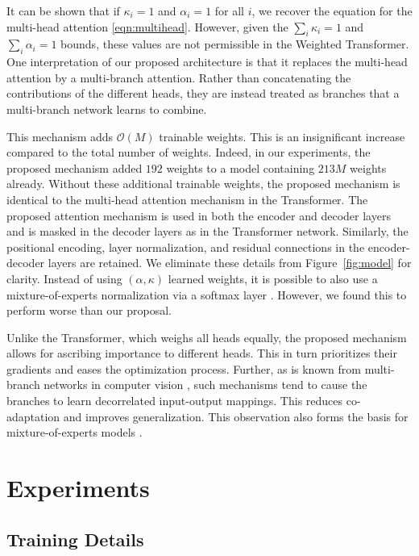 \documentclass{article} %
\newcommand{\name}{Weighted Transformer\xspace}
\begin{document}
{It can be shown that if $\kappa_i=1$ and $\alpha_i=1$ for all $i$, we recover the equation for the multi-head attention \eqref{eqn:multihead}. However, given the $\sum_i \kappa_i=1$ and $\sum_i \alpha_i=1$ bounds, these values are not permissible in the \name. One interpretation of our proposed architecture is that it replaces the multi-head attention by a multi-branch attention. Rather than concatenating the contributions of the different heads, they are instead treated as branches that a multi-branch network learns to combine.

This mechanism adds $\mathcal{O}(M)$ trainable weights. This is an insignificant increase compared to the total number of weights. Indeed, in our experiments, the proposed mechanism added $192$ weights to a model containing $213M$ weights already. Without these additional trainable weights, the proposed mechanism is identical to the multi-head attention mechanism in the Transformer. The proposed attention mechanism is used in both the encoder and decoder layers and is masked in the decoder layers as in the Transformer network. Similarly, the positional encoding, layer normalization, and residual connections in the encoder-decoder layers are retained. We eliminate these details from Figure~\ref{fig:model} for clarity. Instead of using $(\alpha,\kappa)$ learned weights, it is possible to also use a mixture-of-experts normalization via a softmax layer \citep{shazeer2017outrageously}. However, we found this to perform worse than our proposal. 

Unlike the Transformer, which weighs all heads equally, the proposed mechanism allows for ascribing importance to different heads. This in turn prioritizes their gradients and eases the optimization process. Further, as is known from multi-branch networks in computer vision \citep{gastaldi2017shake}, such mechanisms tend to cause the branches to learn decorrelated input-output mappings. This reduces co-adaptation and improves generalization. This observation also forms the basis for mixture-of-experts models \citep{shazeer2017outrageously}. %
}

\section{Experiments}

\subsection{Training Details}
\end{document}
